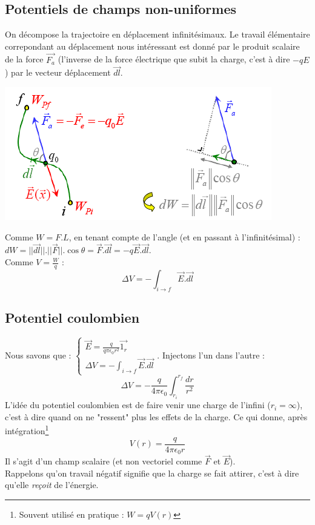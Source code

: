 \documentclass	[11pt, a4paper, openany]{book}
\begin{document}
\subsection{Potentiels de champs non-uniformes}
On décompose la trajectoire en déplacement infinitésimaux. Le travail élémentaire correpondant au déplacement nous intéressant est donné par le produit scalaire de la force $\vec{F_a}$ (l'inverse de la force électrique que subit la charge, c'est à dire $-qE$) par le vecteur déplacement $\vec{dl}$.
\begin{center}
\includegraphics[scale=0.6]{es/image9.png}
\end{center}
Comme $W = F.L$, en tenant compte de l'angle (et en passant à l'infinitésimal) : $dW = ||\vec{dl}||.||\vec{F}||.\cos\theta = \vec{F}.\vec{dl} = -q\vec{E}.\vec{dl}$.\\
Comme $V = \frac{W}{q}$ :
\begin{equation}
\Delta V = - \int_{i \rightarrow f} \vec{E}.\vec{dl}
\end{equation}

\subsection{Potentiel coulombien}
Nous savons que : $\left\{\begin{array}{l}
\vec{E} = \frac{q}{q\pi \epsilon_0 r^2}\vec{1_r}\\
\Delta V = - \int_{i \rightarrow f} \vec{E}.\vec{dl}
\end{array}\right.$. Injectons l'un dans l'autre :
\begin{equation}
\Delta V = -\frac{q}{4\pi \epsilon_0}\int_{r_i}^{r_f} \frac{dr}{r^2}
\end{equation}
L'idée du potentiel coulombien est de faire venir une charge de l'infini ($r_i = \infty$), c'est à dire quand on ne "ressent" plus les effets de la charge. Ce qui donne, après intégration\footnote{Souvent utilisé en pratique : $W = qV(r)$}
\begin{equation}
V(r) = \frac{q}{4\pi \epsilon_0 r}
\end{equation}
Il s'agit d'un champ scalaire (et non vectoriel comme $\vec{F}$ et $\vec E$).\\
Rappelons qu'on travail négatif signifie que la charge se fait attirer, c'est à dire qu'elle \textit{reçoit} de l'énergie.
\end{document}
